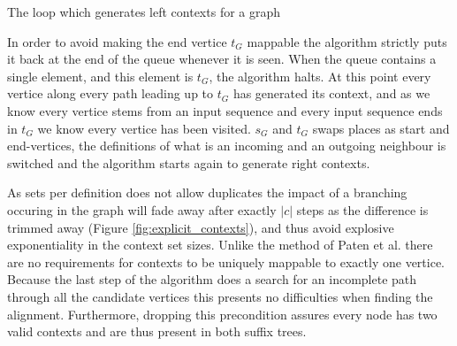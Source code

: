 \documentclass[thesis.tex]{subfiles}
\begin{document}
\begin{center}
  \begin{algorithm}[!t]
    \begin{mdframed}
    \end{mdframed}
    \caption{The loop which generates left contexts for a graph}
  \end{algorithm}
\end{center}
\par\noindent
In order to avoid making the end vertice $t_G$ mappable the algorithm strictly puts it back at the end of the queue whenever it is seen. When the queue contains a single element, and this element is $t_G$, the algorithm halts. At this point every vertice along every path leading up to $t_G$ has generated its context, and as we know every vertice stems from an input sequence and every input sequence ends in $t_G$ we know every vertice has been visited. $s_G$ and $t_G$ swaps places as start and end-vertices, the definitions of what is an incoming and an outgoing neighbour is switched and the algorithm starts again to generate right contexts.\\
\par\noindent
As sets per definition does not allow duplicates the impact of a branching occuring in the graph will fade away after exactly $|c|$ steps as the difference is trimmed away (Figure \ref{fig:explicit_contexts}), and thus avoid explosive exponentiality in the context set sizes. Unlike the method of Paten et al. \cite{mapping_to_a_reference_genome_structure} there are no requirements for contexts to be uniquely mappable to exactly one vertice. Because the last step of the algorithm does a search for an incomplete path through all the candidate vertices this presents no difficulties when finding the alignment. Furthermore, dropping this precondition assures every node has two valid contexts and are thus present in both suffix trees.\\
\end{document}

